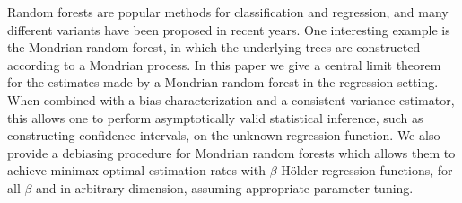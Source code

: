 Random forests are popular methods for
classification and regression,
and many different variants have
been proposed in recent years.
One interesting example is the Mondrian random forest,
in which the underlying trees are constructed according to a Mondrian process.
In this paper we give a central limit theorem
for the estimates made by a Mondrian random forest
in the regression setting.
When combined with a bias characterization and a
consistent variance estimator,
this allows one to perform asymptotically valid statistical inference,
such as constructing confidence intervals,
on the unknown regression function.
We also provide a debiasing procedure for Mondrian random
forests which allows them to achieve minimax-optimal estimation rates
with $\beta$-H{\"o}lder regression functions, for all $\beta$
and in arbitrary dimension, assuming appropriate parameter tuning.
